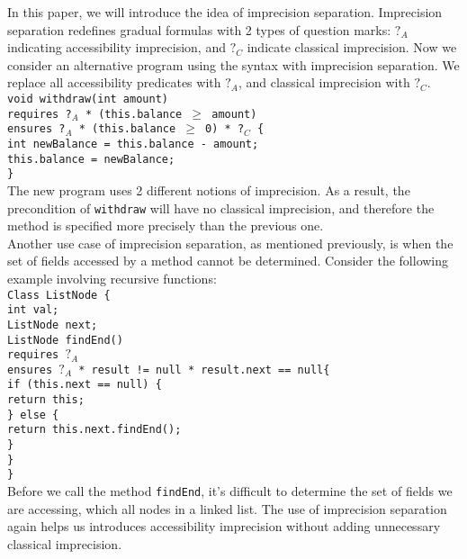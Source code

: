 \documentclass {article}
\begin{document}
In this paper, we will introduce the idea of imprecision separation. Imprecision separation redefines gradual formulas with 2 types of question marks: $?_A$ indicating accessibility imprecision, and $?_C$ indicate classical imprecision. Now we consider an alternative program using the syntax with imprecision separation. We replace all accessibility predicates with $?_A$, and classical imprecision with $?_C$.\\
\texttt{void withdraw(int amount) \\
\setlength\parindent{24pt}
\indent requires ?$_A$ * (this.balance $\geq$ amount)\\
\indent ensures ?$_A$ *  (this.balance $\geq$ 0) * ?$_C$ \{\\
\indent int newBalance = this.balance - amount;\\
\indent this.balance = newBalance; \\
\}\\
}
\setlength\parindent{0pt}
The new program uses 2 different notions of imprecision. As a result, the precondition of \texttt{withdraw} will have no classical imprecision, and therefore the method is specified more precisely than the previous one.\\

Another use case of imprecision separation, as mentioned previously, is when the set of fields accessed by a method cannot be determined. Consider the following example involving recursive functions:\\
\texttt{\noindent Class ListNode \{  \\
\setlength\parindent{24pt}
\indent int val;\\
\indent ListNode next;\\
\indent ListNode findEnd()\\
\indent \indent requires $?_A$\\
\indent \indent ensures $?_A$ * result != null * result.next == null\{\\ 
\indent \indent if (this.next == null) \{\\
\indent \indent \indent return this;\\
\indent \indent \} else \{\\
\indent \indent \indent return this.next.findEnd();\\
\indent \indent \}\\
\indent \}\\
\}\\
}
\setlength\parindent{0pt}
Before we call the method \texttt{findEnd}, it's difficult to determine the set of fields we are accessing, which all nodes in a linked list. The use of imprecision separation again helps us introduces accessibility imprecision without adding unnecessary classical imprecision.\\
\end{document}
